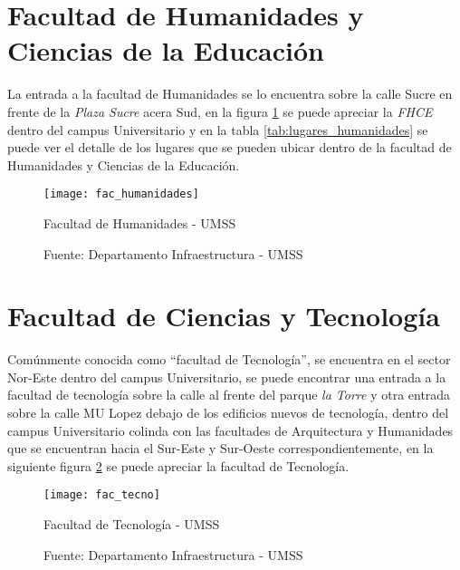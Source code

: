 



\section{Facultad de Humanidades y Ciencias de la Educación}
\label{sec:facultad_humanidades}

La entrada a la facultad de Humanidades se lo encuentra sobre la calle Sucre en frente de la \emph{Plaza Sucre} acera Sud, en la figura \ref{fig:fac_humanidades} se puede apreciar la \emph{FHCE} dentro del campus Universitario y en la tabla \ref{tab:lugares_humanidades} se puede ver el detalle de los lugares que se pueden ubicar dentro de la facultad de Humanidades y Ciencias de la Educación.

\begin{figure}[H]
 \begin{center}
   \texttt{[image: fac\_humanidades]}
   \caption{Facultad de Humanidades - UMSS}
   \label{fig:fac_humanidades}
   \caption*{Fuente: Departamento Infraestructura - UMSS}
 \end{center}
\end{figure}




\section{Facultad de Ciencias y Tecnología}
\label{sec:facultad_tecnologia}

Comúnmente conocida como ``facultad de Tecnología'',  se encuentra en el sector Nor-Este dentro del campus Universitario, se puede encontrar una entrada a la facultad de tecnología sobre la calle  al frente del parque \emph{la Torre} y otra entrada sobre la calle MU Lopez debajo de los edificios nuevos de tecnología, dentro del campus Universitario colinda con las facultades de Arquitectura y Humanidades que se encuentran hacia el Sur-Este y Sur-Oeste correspondientemente, en la siguiente figura \ref{fig:fac_tecno} se puede apreciar la facultad de Tecnología.

\begin{figure}[H]
 \begin{center}
   \texttt{[image: fac\_tecno]}
   \caption{Facultad de Tecnología - UMSS}
   \label{fig:fac_tecno}
   \caption*{Fuente: Departamento Infraestructura - UMSS}
 \end{center}
\end{figure}

